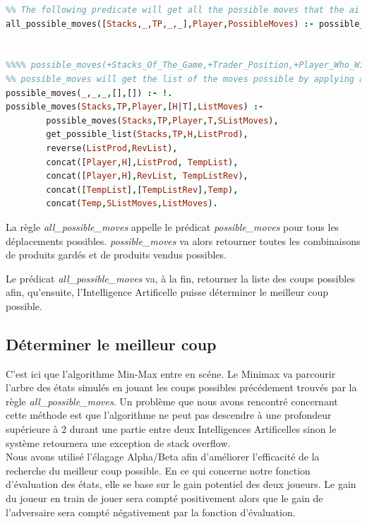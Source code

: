 \documentclass[a4paper, 11pt,twoside, leqno]{report}
\theoremstyle{plain}
\begin{document}
\begin{lstlisting}[language=prolog]
%%%% all_possible_moves(+State_Of_The_Game,+Player_Who_Will_Make_The_Move,?Possible_Moves)
%% The following predicate will get all the possible moves that the ai could make.
all_possible_moves([Stacks,_,TP,_,_],Player,PossibleMoves) :- possible_moves(Stacks,TP,Player,[1,2,3],PossibleMoves).


%%%% possible_moves(+Stacks_Of_The_Game,+Trader_Position,+Player_Who_Will_Make_The_Move,+List_Of_Jumps_To_make,?List_Of_Moves)
%% possible_moves will get the list of the moves possible by applying all the jumps given in the fourth parameter. In that game the list should be [1,2,3].
possible_moves(_,_,_,[],[]) :- !.
possible_moves(Stacks,TP,Player,[H|T],ListMoves) :-
		possible_moves(Stacks,TP,Player,T,SListMoves), 
		get_possible_list(Stacks,TP,H,ListProd),
		reverse(ListProd,RevList),
		concat([Player,H],ListProd, TempList),
		concat([Player,H],RevList, TempListRev),
		concat([TempList],[TempListRev],Temp),
		concat(Temp,SListMoves,ListMoves).
\end{lstlisting}

La règle \textit{all\_{}possible\_{}moves} appelle le prédicat \textit{possible\_{}moves} pour tous les déplacements possibles. \textit{possible\_{}moves} va alors retourner toutes les combinaisons de produits gardés et de produits vendus possibles.

Le prédicat \textit{all\_{}possible\_{}moves} va, à la fin, retourner la liste des coups possibles afin, qu'ensuite, l'Intelligence Artificelle puisse déterminer le meilleur coup possible.

\subsection{Déterminer le meilleur coup}
C'est ici que l'algorithme Min-Max entre en scéne. Le Minimax va parcourir l'arbre des états simulés en jouant les coups possibles précédement trouvés par la règle \textit{all\_{}possible\_{}moves}. Un problème que nous avons rencontré concernant cette méthode est que l'algorithme ne peut pas descendre à une profondeur supérieure à 2 durant une partie entre deux Intelligences Artificelles sinon le système retournera une exception de stack overflow.\\

Nous avons utilisé l'élagage Alpha/Beta afin d'améliorer l'efficacité de la recherche du meilleur coup possible. En ce qui concerne notre fonction d'évaluation des états, elle se base sur le gain potentiel des deux joueurs. Le gain du joueur en train de jouer sera compté positivement alors que le gain de l'adversaire sera compté négativement par la fonction d'évaluation. \\
\end{document}
